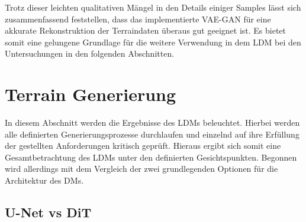 Trotz dieser leichten qualitativen Mängel in den Details einiger Samples lässt sich zusammenfassend feststellen, dass das implementierte VAE-GAN für eine akkurate Rekonstruktion der Terraindaten überaus gut geeignet ist. Es bietet somit eine gelungene Grundlage für die weitere Verwendung in dem LDM bei den Untersuchungen in den folgenden Abschnitten.

\section {Terrain Generierung}

In diesem Abschnitt werden die Ergebnisse des LDMs beleuchtet. Hierbei werden alle definierten Generierungsprozesse durchlaufen und einzelnd auf ihre Erfüllung der gestellten Anforderungen kritisch geprüft. Hieraus ergibt sich somit eine Gesamtbetrachtung des LDMs unter den definierten Gesichtspunkten. Begonnen wird allerdings mit dem Vergleich der zwei grundlegenden Optionen für die Architektur des DMs. 

\subsection {U-Net vs DiT}

